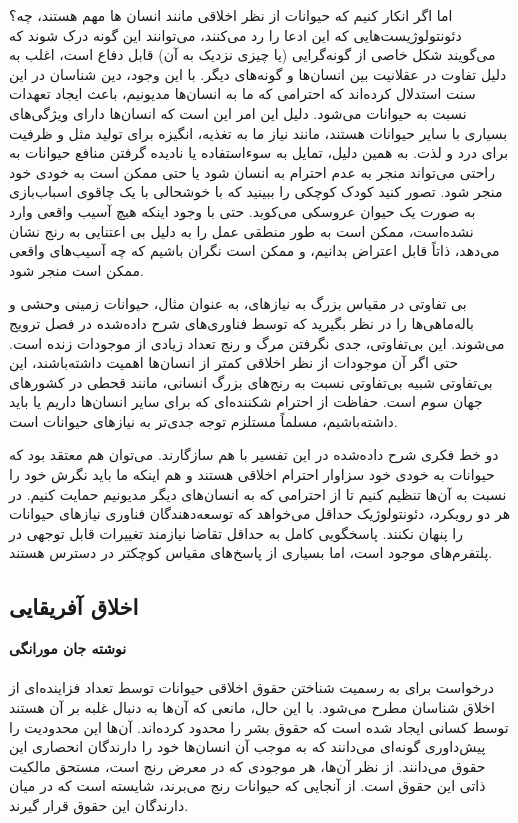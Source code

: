 اما اگر انکار کنیم که حیوانات از نظر اخلاقی مانند انسان ها مهم هستند، چه؟ دئونتولوژیست‌هایی که این ادعا را رد می‌کنند، می‌توانند این گونه درک شوند که می‌گویند شکل خاصی از گونه‌گرایی (یا چیزی نزدیک به آن) قابل دفاع است، اغلب به دلیل تفاوت در عقلانیت بین انسان‌ها و گونه‌های دیگر.
با این وجود، دین شناسان در این سنت استدلال کرده‌اند که احترامی که ما به انسان‌ها مدیونیم، باعث ایجاد تعهدات نسبت به حیوانات می‌شود.
دلیل این امر این است که انسان‌ها دارای ویژگی‌های بسیاری با سایر حیوانات هستند، مانند نیاز ما به تغذیه، انگیزه برای تولید مثل و ظرفیت برای درد و لذت.
به همین دلیل، تمایل به سوء‌استفاده یا نادیده گرفتن منافع حیوانات به راحتی می‌تواند منجر به عدم احترام به انسان شود یا حتی ممکن است به خودی خود منجر شود.
تصور کنید کودک کوچکی را ببینید که با خوشحالی با یک چاقوی اسباب‌بازی به صورت یک حیوان عروسکی می‌کوبد.
حتی با وجود اینکه هیچ آسیب واقعی وارد نشده‌است، ممکن است به طور منطقی عمل را به دلیل بی اعتنایی به رنج نشان می‌دهد، ذاتاً قابل اعتراض بدانیم، و ممکن است نگران باشیم که چه آسیب‌های واقعی ممکن است منجر شود.

بی تفاوتی در مقیاس بزرگ به نیازهای، به عنوان مثال، حیوانات زمینی وحشی و باله‌ماهی‌ها را در نظر بگیرید که توسط فناوری‌های شرح داده‌شده در فصل ترویج می‌شوند.
این بی‌تفاوتی، جدی نگرفتن مرگ و رنج تعداد زیادی از موجودات زنده است.
حتی اگر آن موجودات از نظر اخلاقی کمتر از انسان‌ها اهمیت داشته‌باشند، این بی‌تفاوتی شبیه بی‌تفاوتی نسبت به رنج‌های بزرگ انسانی، مانند قحطی در کشورهای جهان سوم است.
حفاظت از احترام شکننده‌ای که برای سایر انسان‌ها داریم یا باید داشته‌باشیم، مسلماً مستلزم توجه جدی‌تر به نیازهای حیوانات است.

دو خط فکری شرح داده‌شده در این تفسیر با هم سازگارند.
می‌توان هم معتقد بود که حیوانات به خودی خود سزاوار احترام اخلاقی هستند و هم اینکه ما باید نگرش خود را نسبت به آن‌ها تنظیم کنیم تا از احترامی که به انسان‌های دیگر مدیونیم حمایت کنیم.
در هر دو رویکرد، دئونتولوژیک حداقل می‌خواهد که توسعه‌دهندگان فناوری نیازهای حیوانات را پنهان نکنند.
پاسخگویی کامل به حداقل تقاضا نیازمند تغییرات قابل توجهی در پلتفرم‌های موجود است، اما بسیاری از پاسخ‌های مقیاس کوچکتر در دسترس هستند.
\newline
\newline



{
\subsection*{اخلاق آفریقایی}
\label{subsec:اخلاق آفریقایی}
\noindent \textbf{نوشته جان مورانگی}
\\\\
درخواست برای به رسمیت شناختن حقوق اخلاقی حیوانات توسط تعداد فزاینده‌ای از اخلاق شناسان مطرح می‌شود. با این حال، مانعی که آن‌ها به دنبال غلبه بر آن هستند توسط کسانی ایجاد شده است که حقوق بشر را محدود کرده‌اند. آن‌ها این محدودیت را پیش‌داوری گونه‌ای می‌دانند که به موجب آن انسان‌ها خود را دارندگان انحصاری این حقوق می‌دانند. از نظر آن‌ها، هر موجودی که در معرض رنج است، مستحق مالکیت ذاتی این حقوق است. از آنجایی که حیوانات رنج می‌برند، شایسته است که در میان دارندگان این حقوق قرار گیرند.
}

